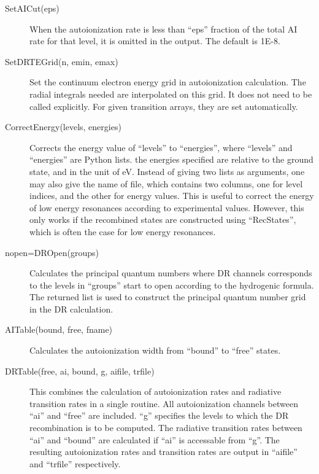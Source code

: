 \documentclass[12pt]{article}
\begin{document}
\begin{description}
\item[SetAICut(eps)] When the autoionization rate is less than ``eps''
fraction of the total AI rate for that level, it is omitted in the output. The
default is 1E-8.

\item[SetDRTEGrid(n, emin, emax)] 
Set the continuum electron energy grid in
autoionization calculation. The radial integrals needed are interpolated on
this grid. It does not need to be called explicitly. For given transition
arrays, they are set automatically. 

\item[CorrectEnergy(levels, energies)]
Corrects the energy value of ``levels'' to ``energies'', where ``levels'' and
``energies'' are Python lists. the energies specified are relative to the
ground state, and in the unit of eV. Instead of giving two lists as arguments,
one may also give the name of file, which contains two columns, one for level
indices, and the other for energy values. This is useful to correct the energy
of low energy resonances according to experimental values. However, this only
works if the recombined states are constructed using ``RecStates'', which is
often the case for low energy resonances. 

\item[nopen=DROpen(groups)]
Calculates the principal quantum numbers where DR channels corresponds to the
levels in ``groups'' start to open according to the hydrogenic formula. The
returned list is used to construct the 
principal quantum number grid in the DR calculation. 

\item[AITable(bound, free, fname)] Calculates the autoionization width from
``bound'' to ``free'' states. 

\item[DRTable(free, ai, bound, g, aifile, trfile)] This combines the
calculation of autoionization rates and radiative transition rates in a single
routine. All autoionization channels between ``ai'' and ``free'' are
included. ``g'' specifies the levels to which the DR recombination is to be
computed. The radiative transition rates between ``ai'' and ``bound'' are
calculated if ``ai'' is accessable from ``g''. The resulting autoionization
rates and transition rates are output in ``aifile'' and ``trfile''
respectively. 

\end{description}
\end{document}
